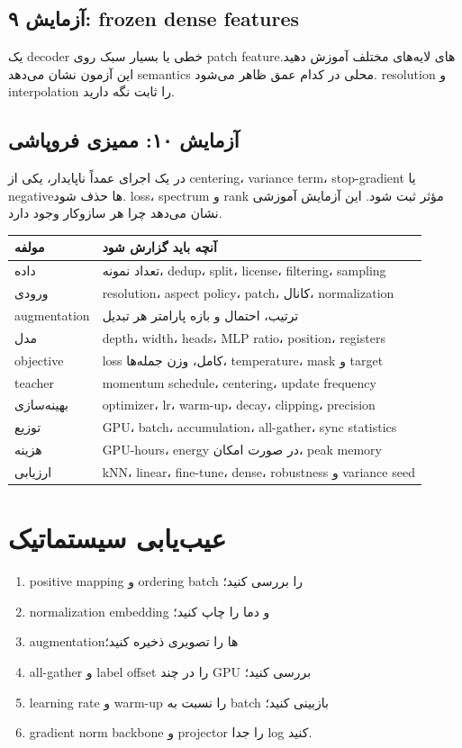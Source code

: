 \documentclass[12pt,openany,oneside]{book}
\begin{document}
\subsection{آزمایش ۹: frozen dense features}
یک decoder خطی یا بسیار سبک روی patch featureهای لایه‌های مختلف آموزش دهید. این آزمون نشان می‌دهد semantics محلی در کدام عمق ظاهر می‌شود. resolution و interpolation را ثابت نگه دارید.

\subsection{آزمایش ۱۰: ممیزی فروپاشی}
در یک اجرای عمداً ناپایدار، یکی از centering، variance term، stop-gradient یا negativeها حذف شود. loss، spectrum و rank مؤثر ثبت شود. این آزمایش آموزشی نشان می‌دهد چرا هر سازوکار وجود دارد.

\begin{researchbox}
\begin{longtable}{p{38mm}p{96mm}}
\toprule
مولفه & آنچه باید گزارش شود \\
\midrule
داده & تعداد نمونه، dedup، split، license، filtering، sampling \\
ورودی & resolution، aspect policy، patch، کانال، normalization \\
augmentation & ترتیب، احتمال و بازه پارامتر هر تبدیل \\
مدل & depth، width، heads، MLP ratio، position، registers \\
objective & loss کامل، وزن جمله‌ها، temperature، mask و target \\
teacher & momentum schedule، centering، update frequency \\
بهینه‌سازی & optimizer، lr، warm-up، decay، clipping، precision \\
توزیع & GPU، batch، accumulation، all-gather، sync statistics \\
هزینه & GPU-hours، energy در صورت امکان، peak memory \\
ارزیابی & kNN، linear، fine-tune، dense، robustness و variance seed \\
\bottomrule
\end{longtable}
\end{researchbox}

\section{عیب‌یابی سیستماتیک}
\begin{diagnosticbox}
\begin{enumerate}
\item positive mapping و ordering batch را بررسی کنید؛
\item normalization embedding و دما را چاپ کنید؛
\item augmentationها را تصویری ذخیره کنید؛
\item all-gather و label offset را در چند GPU بررسی کنید؛
\item learning rate و warm-up را نسبت به batch بازبینی کنید؛
\item gradient norm backbone و projector را جدا log کنید.
\end{enumerate}
\end{diagnosticbox}
\end{document}
